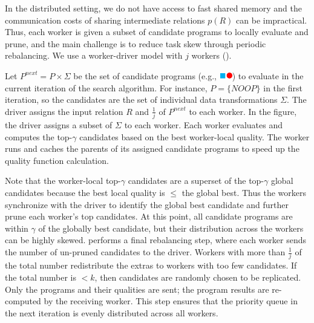 In the distributed setting, we do not have access to fast shared memory and the communication costs of sharing intermediate relations $p(R)$ can be impractical.  Thus, each worker is given a subset of candidate programs to locally evaluate and prune, and the main challenge is to reduce task skew through periodic rebalancing.  We use a worker-driver model with $j$ workers ().

Let $P^{next} = P\times \Sigma$ be the set of candidate programs (e.g., \includegraphics[height=8pt]{figures/program.pdf}) to evaluate in the current iteration of the search algorithm. For instance, $P=\{NOOP\}$ in the first iteration, so the candidates are the set of individual data transformations $\Sigma$.   The driver assigns the input relation $R$ and $\frac{1}{j}$ of $P^{next}$ to each worker.  In the figure, the driver assigns a subset of $\Sigma$ to each worker.  Each worker evaluates and computes the top-$\gamma$ candidates based on the best worker-local quality.   The worker runs and caches the parents of its assigned candidate programs to speed up the quality function calculation.
  
Note that the worker-local top-$\gamma$ candidates are a superset of the top-$\gamma$ global candidates because the best local quality is $\le$ the global best.   Thus the workers synchronize with the driver to identify the global best candidate and further prune each worker's top candidates.  At this point, all candidate programs are within $\gamma$ of the globally best candidate, but their distribution across the workers can be highly skewed.  \sys performs a final rebalancing step, where each worker sends the number of un-pruned candidates to the driver.  Workers with more than $\frac{1}{j}$ of the total number redistribute the extras to workers with too few candidates.  If the total number is $<k$, then candidates are randomly chosen to be replicated.  Only the programs and their qualities are sent; the program results are re-computed by the receiving worker.  This step ensures that the priority queue in the next iteration is evenly distributed across all workers.  


